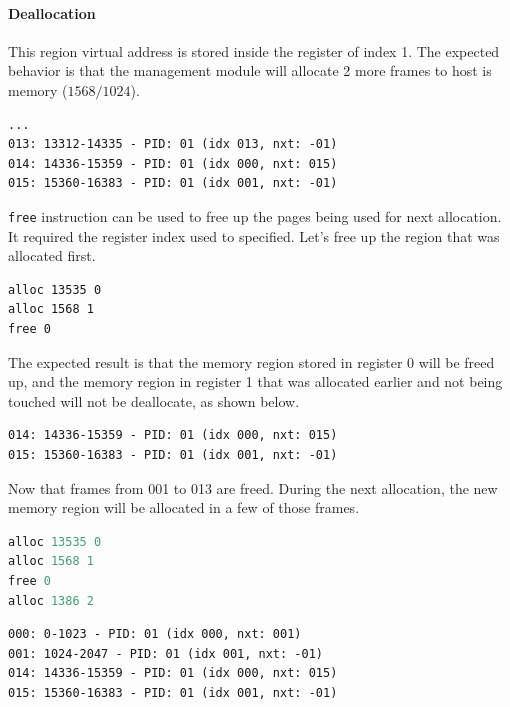 \documentclass[]{article}
\begin{document}
\paragraph{Deallocation}
This region virtual address is stored inside the register of index 1. The expected behavior is that the management module will allocate 2 more frames to host is memory ($1568 / 1024$).
\begin{lstlisting}
...
013: 13312-14335 - PID: 01 (idx 013, nxt: -01)
014: 14336-15359 - PID: 01 (idx 000, nxt: 015)
015: 15360-16383 - PID: 01 (idx 001, nxt: -01)	
\end{lstlisting}
\lstinline|free| instruction can be used to free up the pages being used for next allocation. It required the register index used to specified. Let's free up the region that was allocated first.
 \begin{lstlisting}
alloc 13535 0
alloc 1568 1
free 0
\end{lstlisting}
The expected result is that the memory region stored in register 0 will be freed up, and the memory region in register 1 that was allocated earlier and not being touched will not be deallocate, as shown below.
\begin{lstlisting}
014: 14336-15359 - PID: 01 (idx 000, nxt: 015)
015: 15360-16383 - PID: 01 (idx 001, nxt: -01)
\end{lstlisting}
Now that frames from 001 to 013 are freed. During the next allocation, the new memory region will be allocated in a few of those frames.
\begin{lstlisting}[language=C++]
alloc 13535 0
alloc 1568 1
free 0
alloc 1386 2
\end{lstlisting}
\begin{lstlisting}
000: 0-1023 - PID: 01 (idx 000, nxt: 001)
001: 1024-2047 - PID: 01 (idx 001, nxt: -01)
014: 14336-15359 - PID: 01 (idx 000, nxt: 015)
015: 15360-16383 - PID: 01 (idx 001, nxt: -01)
\end{lstlisting}
\end{document}
